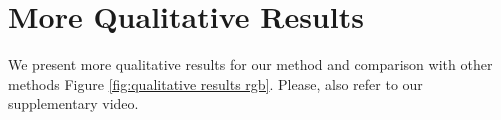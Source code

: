 \documentclass[10pt,twocolumn,letterpaper]{article}
\begin{document}
\section{More Qualitative Results}

We present more qualitative results for our method and comparison with other methods Figure \ref{fig:qualitative results rgb}.  Please, also refer to our supplementary video. 

    
   













{\small


}
\end{document}
